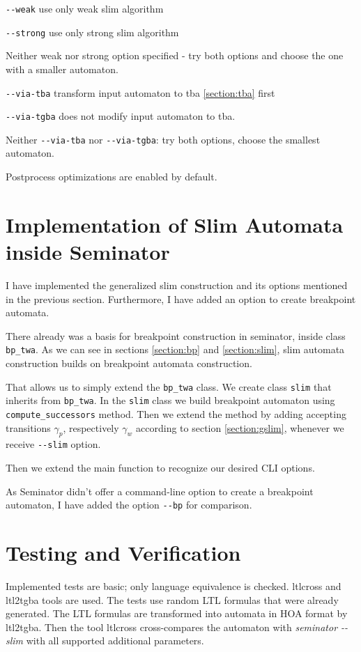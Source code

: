 \documentclass[
	digital,
nolof, nolot
]{fithesis3}
\begin{document}
		\texttt{-{}-weak} use only weak slim algorithm
		
		\texttt{-{}-strong} use only strong slim algorithm
		
		Neither weak nor strong option specified - try both options  and choose the one with a smaller automaton.
		
		\texttt{-{}-via-tba} transform input automaton to tba \ref{section:tba} first
		
		\texttt{-{}-via-tgba} does not modify input automaton to tba.
		
		Neither \texttt{-{}-via-tba} nor \texttt{-{}-via-tgba}: try both options, choose the smallest automaton.
		
		Postprocess optimizations are enabled by default.
		
		
	\section{Implementation of Slim Automata inside Seminator}
	I have implemented the generalized slim construction and its options mentioned in the previous section. Furthermore, I have added an option to create breakpoint automata.
	
	There already was a basis for breakpoint construction in seminator, inside class \texttt{bp\_twa}.
	As we can see in sections \ref{section:bp} and \ref{section:slim}, slim automata construction builds on breakpoint automata construction.
	
	That allows us to simply extend the \texttt{bp\_twa} class.
	We create class \texttt{slim} that inherits from \texttt{bp\_twa}.
	In the \texttt{slim} class we build breakpoint automaton using \texttt{compute\_successors} method.
	Then we extend the method by adding accepting transitions $\gamma_p$, respectively $\gamma_w$ according to section \ref{section:gslim}, whenever we receive \texttt{-{}-slim} option.
	
	Then we extend the main function to recognize our desired CLI options.
	
	As Seminator didn't offer a command-line option to create a breakpoint automaton, I have added the option \texttt{-{}-bp} for comparison.
	
	
	
	\section{Testing and Verification}
	Implemented tests are basic; only language equivalence is checked.
	ltlcross and ltl2tgba tools are used. The tests use random LTL formulas that were already generated. The LTL formulas are transformed into automata in HOA format by ltl2tgba.
	Then the tool ltlcross cross-compares the automaton with \emph{seminator -{}-slim} with all supported additional parameters.
	
\end{document}
